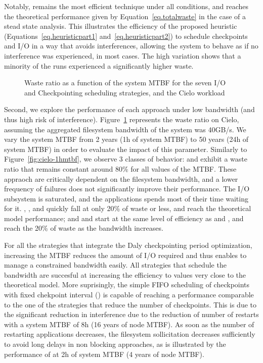 Notably, \cooperative remains the most efficient technique under all
conditions, and reaches the theoretical performance given by
Equation~\eqref{eq.totalwaste} in the case of a stead state
analysis. This illustrates the efficiency of the proposed heuristic
(Equations~\eqref{eq.heuristicpart1} and~\eqref{eq.heuristicpart2}) to
schedule checkpoints and I/O in a way that avoids interferences,
allowing the system to behave as if no interference was experienced,
in most cases. The high variation shows that a minority of the runs
experienced a significantly higher waste.

\begin{figure}
  \begin{center}
    \resizebox{\linewidth}{!}{}
  \end{center}
  \caption{Waste ratio as a function of the system MTBF for the
    seven I/O and Checkpointing scheduling strategies, and the Cielo
    workload \label{fig:cielo-40gbs}}
\end{figure}

Second, we explore the performance of each approach under low
bandwidth (and thus high risk of
interference). Figure~\ref{fig:cielo-40gbs} represents the waste ratio
on Cielo, assuming the aggregated filesystem bandwidth of the system
was 40GB/s. We vary the system MTBF from 2 years (1h of system MTBF) to
50 years (24h of system MTBF) in order to evaluate the impact of this
parameter. Similarly to Figure~\ref{fig:cielo-1hmtbf}, we observe 3
classes of behavior: \propfixed and \bfifofixed exhibit a waste ratio
that remains constant around 80\% for all values of the MTBF. These
appraoch are critically dependent on the filesystem bandwidth, and a
lower frequency of failures does not significantly improve their
performance. The I/O subsystem is saturated, and the applications
spends most of their time waiting for it. \fifodaly, \fifofixed, and
\cooperative quickly fall at only 20\% of waste or less, and reach
the theoretical model performance; and \propdaly and \bfifodaly start
at the same level of efficiency as \propfixed and \bfifofixed, and
reach the 20\% of waste as the bandwidth increases.

For all the strategies that integrate the Daly checkpointing period
optimization, increasing the MTBF reduces the amount of I/O required
and thus enables to manage a constrained bandwidth easily. All
strategies that schedule the bandwidth are succesful at increasing the
efficiency to values very close to the theoretical model. More
suprisingly, the simple FIFO scheduling of checkpoints with fixed
chekpoint interval (\bfifofixed) is capable of reaching a performance
comparable to the one of the strategies that reduce the number of
checkpoints. This is due to the significant reduction in interference
due to the reduction of number of restarts with a system MTBF of 8h
(16 years of node MTBF). As soon as the number of restarting
applications decreases, the filesystem sollicitation decreases
sufficiently to avoid long delays in non blocking approaches, as is
illustrated by the performance of \fifofixed at 2h of system MTBF (4
years of node MTBF).

